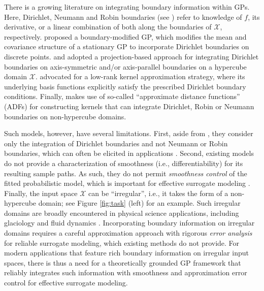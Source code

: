 \documentclass[aos,preprint]{imsart}
\theoremstyle{plain}
\theoremstyle{remark}
\begin{document}
There is a growing literature on integrating boundary information within GPs. Here, Dirichlet, Neumann and Robin boundaries (see \cite{zwillinger2021handbook}) refer to knowledge of $f$, its derivative, or a linear combination of both along the boundaries of $\mathcal{X}$, respectively. \cite{tan2018gaussian, li2022improving} proposed a boundary-modified GP, which modifies the mean and covariance structure of a stationary GP to incorporate Dirichlet boundaries on discrete points. \cite{vernon2019known} and \cite{jackson2023efficient} adopted a projection-based approach for integrating Dirichlet boundaries on axis-symmetric and/or axis-parallel boundaries on a hypercube domain $\mathcal{X}$. \cite{gulian2022gaussian,solin2019know,solin2020hilbert} advocated for a low-rank kernel approximation strategy, where its underlying basis functions explicitly satisfy the prescribed Dirichlet boundary conditions. Finally, \cite{dalton2024boundary} makes use of so-called ``approximate distance functions'' (ADFs) for constructing kernels that can integrate Dirichlet, Robin or Neumann boundaries on non-hypercube domains.

Such models, however, have several limitations. First, aside from \cite{dalton2024boundary}, they consider only the integration of Dirichlet boundaries and not Neumann or Robin boundaries, which can often be elicited in applications \cite{dalton2024boundary}. Second, existing models do not provide a characterization of smoothness (i.e., differentiability) for its resulting sample paths. As such, they do not permit \textit{smoothness control} of the fitted probabilistic model, which is important for effective surrogate modeling \cite{santner2003}. Finally, the input space $\mathcal{X}$ can be ``irregular'', i.e., it takes the form of a non-hypercube domain; see Figure \ref{fig:task} (left) for an example. Such irregular domains are broadly encountered in physical science applications, including glaciology \citep{pratola2017design} and fluid dynamics \cite{mak2018efficient,dalton2024boundary}. Incorporating boundary information on irregular domains requires a careful approximation approach with rigorous \textit{error analysis} for reliable surrogate modeling, which existing methods do not provide. For modern applications that feature rich boundary information on irregular input spaces, there is thus a need for a theoretically grounded GP framework that reliably integrates such information with smoothness and approximation error control for effective surrogate modeling.
\end{document}
